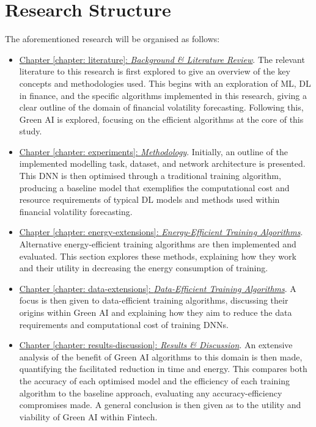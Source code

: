 \documentclass[a4paper, 11pt]{report}
\begin{document}
    \section{Research Structure}
    \label{section: structure}

    The aforementioned research will be organised as follows: 

    \begin{itemize}
        \item \underline{Chapter \ref{chapter: literature}: \emph{Background \& Literature Review}}. The relevant literature to this research is first explored to give an overview of the key concepts and methodologies used. This begins with an exploration of ML, DL in finance, and the specific algorithms implemented in this research, giving a clear outline of the domain of financial volatility forecasting. Following this, Green AI is explored, focusing on the efficient algorithms at the core of this study.
        
        \item \underline{Chapter \ref{chapter: experiments}: \emph{Methodology}}. Initially, an outline of the implemented modelling task, dataset, and network architecture is presented. This DNN is then optimised through a traditional training algorithm, producing a baseline model that exemplifies the computational cost and resource requirements of typical DL models and methods used within financial volatility forecasting.

        \item \underline{Chapter \ref{chapter: energy-extensions}: \emph{Energy-Efficient Training Algorithms}}. Alternative energy-efficient training algorithms are then implemented and evaluated. This section explores these methods, explaining how they work and their utility in decreasing the energy consumption of training.
        
        \item \underline{Chapter \ref{chapter: data-extensions}: \emph{Data-Efficient Training Algorithms}}. A focus is then given to data-efficient training algorithms, discussing their origins within Green AI and explaining how they aim to reduce the data requirements and computational cost of training DNNs.
        
        \item \underline{Chapter \ref{chapter: results-discussion}: \emph{Results \& Discussion}}. An extensive analysis of the benefit of Green AI algorithms to this domain is then made, quantifying the facilitated reduction in time and energy. This compares both the accuracy of each optimised model and the efficiency of each training algorithm to the baseline approach, evaluating any accuracy-efficiency compromises made. A general conclusion is then given as to the utility and viability of Green AI within Fintech.
    \end{itemize}
\end{document}
